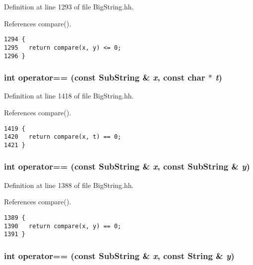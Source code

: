 Definition at line 1293 of file Big\-String.hh.

References compare().



\footnotesize\begin{verbatim}1294 {
1295   return compare(x, y) <= 0; 
1296 }
\end{verbatim}\normalsize 
{}
\subsubsection{\setlength{\rightskip}{0pt plus 5cm}int operator== (const {\bf Sub\-String} \& {\em x}, const char $\ast$ {\em t})\hspace{0.3cm}{\tt  [inline]}}\label{BigString_8hh_a116}




Definition at line 1418 of file Big\-String.hh.

References compare().



\footnotesize\begin{verbatim}1419 {
1420   return compare(x, t) == 0; 
1421 }
\end{verbatim}\normalsize 
{}
\subsubsection{\setlength{\rightskip}{0pt plus 5cm}int operator== (const {\bf Sub\-String} \& {\em x}, const {\bf Sub\-String} \& {\em y})\hspace{0.3cm}{\tt  [inline]}}\label{BigString_8hh_a110}




Definition at line 1388 of file Big\-String.hh.

References compare().



\footnotesize\begin{verbatim}1389 {
1390   return compare(x, y) == 0; 
1391 }
\end{verbatim}\normalsize 
{}
\subsubsection{\setlength{\rightskip}{0pt plus 5cm}int operator== (const {\bf Sub\-String} \& {\em x}, const {\bf String} \& {\em y})\hspace{0.3cm}{\tt  [inline]}}\label{BigString_8hh_a104}




